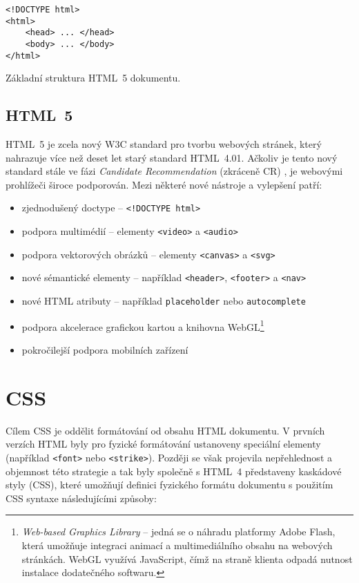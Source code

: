 \begin{example}
    \centering
    \begin{lstlisting}
<!DOCTYPE html>
<html>
    <head> ... </head>
    <body> ... </body>
</html>
    \end{lstlisting}
    \caption{Základní struktura HTML~5 dokumentu.}
    \label{example:html}
\end{example}

\subsection{HTML~5}

HTML~5 je zcela nový W3C standard pro tvorbu webových stránek, který nahrazuje více než deset let starý standard HTML~4.01. Ačkoliv je tento nový standard stále ve fázi \textit{Candidate Recommendation} (zkráceně CR) \cite{17}, je webovými prohlížeči široce podporován. Mezi některé nové nástroje a vylepšení patří:

\begin{itemize}
    \item zjednodušený doctype -- \texttt{<!DOCTYPE html>}
    \item podpora multimédií -- elementy \texttt{<video>} a \texttt{<audio>}
    \item podpora vektorových obrázků -- elementy \texttt{<canvas>} a \texttt{<svg>}
    \item nové sémantické elementy -- například \texttt{<header>}, \texttt{<footer>} a \texttt{<nav>}
    \item nové HTML atributy -- například \texttt{placeholder} nebo \texttt{autocomplete}
    \item podpora akcelerace grafickou kartou a knihovna WebGL\footnote{\textit{Web-based Graphics Library} -- jedná se o náhradu platformy Adobe Flash, která umožňuje integraci animací a multimediálního obsahu na webových stránkách. WebGL využívá JavaScript, čímž na straně klienta odpadá nutnost instalace dodatečného softwaru.}
    \item pokročilejší podpora mobilních zařízení
\end{itemize}

\section{CSS}
\label{sec:css}

Cílem CSS je oddělit formátování od obsahu HTML dokumentu. V prvních verzích HTML byly pro fyzické formátování ustanoveny speciální elementy (například \texttt{<font>} nebo \texttt{<strike>}). Později se však projevila nepřehlednost a objemnost této strategie a tak byly společně s HTML~4 představeny kaskádové styly (CSS), které umožňují definici fyzického formátu dokumentu s použitím CSS syntaxe následujícími způsoby:

